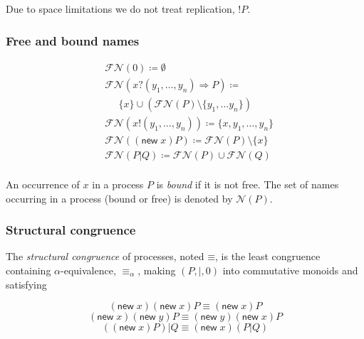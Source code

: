 \documentclass[]{acm_proc_article-sp}
\newcommand{\id}[1]{\texttt{#1}}
\newcommand{\pzero}{\mathbin{0}}
\newcommand{\juxtap}{\mathbin{\id{|}}}
\newcommand{\scong}{\mathbin{\equiv}}
\newcommand{\alphaeq}{\mathbin{\equiv_{\alpha}}}
\newcommand{\names}[1]{\mathbin{\mathcal{N}(#1)}}
\newcommand{\freenames}[1]{\mathbin{\mathcal{FN}(#1)}}
\newcommand{\defneqls}{\coloneqq}
\numberwithin{equation}{subsection}
\begin{document}
Due to space limitations we do not treat replication, $!P$.

\subsubsection{Free and bound names}

\begin{equation*}
  \begin{aligned}
    & \freenames{\pzero} \defneqls \emptyset \\
    & \freenames{{x}{?}{( y_1, \ldots, y_n )} \Rightarrow {P}} \defneqls \\
    & \;\;\;\;\;\{ x \} \cup (\freenames{P} \setminus \{ y_1, \ldots y_n \}) \\
    & \freenames{{x}{!}{( y_1, \ldots, y_n )}} \defneqls \{ x, y_1, \ldots, y_n \} \\
    & \freenames{(\mathsf{new}\; x){P}} \defneqls \freenames{P} \setminus \{x\} \\    
    & \freenames{{P} \juxtap {Q}} \defneqls \freenames{P} \cup \freenames{Q} \\
  \end{aligned}
\end{equation*}

An occurrence of $x$ in a process $P$ is \textit{bound} if it is not
free. The set of names occurring in a process (bound or free) is
denoted by $\names{P}$.

\subsubsection{Structural congruence}
\label{congruence}

The {\em structural congruence} of processes, noted $\scong$, is the
least congruence containing $\alpha$-equivalence, $\alphaeq$, making
$( P, |, 0 )$ into commutative monoids and satisfying

\begin{equation*}  
  (\mathsf{new}\; x)(\mathsf{new}\; x){P} \scong (\mathsf{new}\; x)P
\end{equation*}
\begin{equation*}  
  (\mathsf{new}\; x)(\mathsf{new}\; y){P} \scong (\mathsf{new}\; y)(\mathsf{new}\; x)P
\end{equation*}
\begin{equation*}  
  ((\mathsf{new}\; x){P}) \juxtap {Q} \scong (\mathsf{new}\; x)({P} \juxtap {Q})
\end{equation*}
\end{document}
